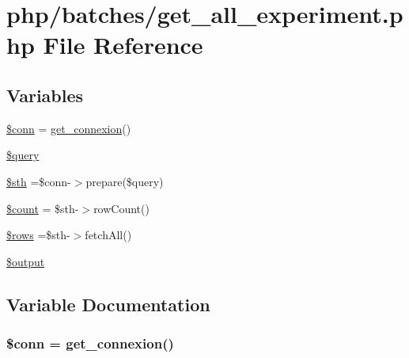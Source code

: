 \hypertarget{batches_2get__all__experiment_8php}{\section{php/batches/get\-\_\-all\-\_\-experiment.php File Reference}
\label{batches_2get__all__experiment_8php}
}
\subsection*{Variables}
\begin{DoxyCompactItemize}
\item 
\hyperlink{batches_2get__all__experiment_8php_aa8a5a87b9c1a6a0819b88447cbe41877}{\$conn} = \hyperlink{php__functions_8php_ace18bc10f3fd08f92688ac743e0d8c2e}{get\-\_\-connexion}()
\item 
\hyperlink{batches_2get__all__experiment_8php_af59a5f7cd609e592c41dc3643efd3c98}{\$query}
\item 
\hyperlink{batches_2get__all__experiment_8php_afa9126f9664959c02795be300a135f93}{\$sth} =\$conn-\/$>$prepare(\$query)
\item 
\hyperlink{batches_2get__all__experiment_8php_af789423037bbc89dc7c850e761177570}{\$count} = \$sth-\/$>$row\-Count()
\item 
\hyperlink{batches_2get__all__experiment_8php_ace2ec39e7df3899fa8df9640ec274b03}{\$rows} =\$sth-\/$>$fetch\-All()
\item 
\hyperlink{batches_2get__all__experiment_8php_a73004ce9cd673c1bfafd1dc351134797}{\$output}
\end{DoxyCompactItemize}


\subsection{Variable Documentation}
\hypertarget{batches_2get__all__experiment_8php_aa8a5a87b9c1a6a0819b88447cbe41877}{
\subsubsection[{\$conn}]{\setlength{\rightskip}{0pt plus 5cm}\$conn = {\bf get\-\_\-connexion}()}}\label{batches_2get__all__experiment_8php_aa8a5a87b9c1a6a0819b88447cbe41877}


